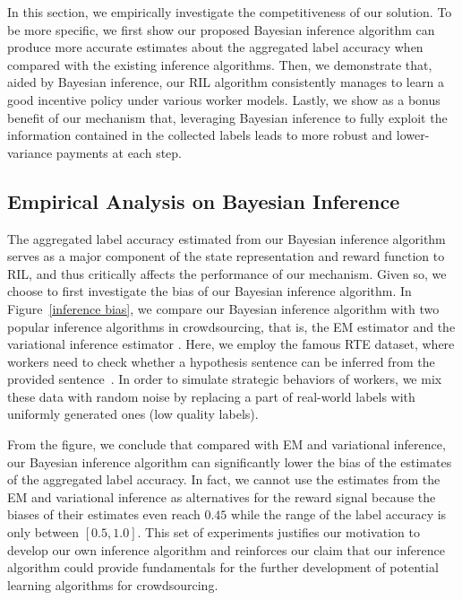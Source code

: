 \documentclass{article}
\begin{document}
In this section, we empirically investigate the competitiveness of our solution. To be more specific, we first show our proposed Bayesian inference algorithm can produce more accurate estimates about the aggregated label accuracy when compared with the existing inference algorithms. Then, we demonstrate that, aided by Bayesian inference, our RIL algorithm consistently manages to learn a good incentive policy under various worker models. Lastly, we show as a bonus benefit of our mechanism that, leveraging Bayesian inference to fully exploit the information contained in the collected labels leads to more robust and lower-variance payments at each step.


\subsection{Empirical Analysis on Bayesian Inference}

The aggregated label accuracy estimated from our Bayesian inference algorithm serves as a major component of the state representation and reward function to RIL, and thus critically affects the performance of our mechanism.
Given so, we choose to first investigate the bias of our Bayesian inference algorithm.
In Figure~\ref{inference bias}, we compare our Bayesian inference algorithm with two popular inference algorithms in crowdsourcing,
that is, the EM estimator \cite{raykar2010learning} and the variational inference estimator \cite{liu2012variational}.
Here, we employ the famous RTE dataset, where workers need to check whether a hypothesis sentence can be inferred from the provided sentence~\cite{snow2008cheap}.
In order to simulate strategic behaviors of workers, we mix these data with random noise by replacing a part of real-world labels with uniformly generated ones (low quality labels).

From the figure, we conclude that compared with EM and variational inference, our Bayesian inference algorithm can significantly lower the bias of the estimates of the aggregated label accuracy. In fact, we cannot use the estimates from the EM and variational inference as alternatives for the reward signal because the biases of their estimates even reach $0.45$ while the range of the label accuracy is only between $[0.5, 1.0]$. This set of experiments justifies our motivation to develop our own inference algorithm and reinforces our claim that our inference algorithm could provide fundamentals for the further development of potential learning algorithms for crowdsourcing.
\end{document}
